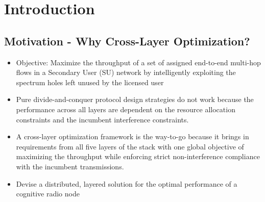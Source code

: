\documentclass[12pt, draftcls, onecolumn]{IEEEtran}
\begin{document}
\section{Introduction}
\subsection{Motivation - Why Cross-Layer Optimization?}
\begin{itemize}
  \item Objective: Maximize the throughput of a set of assigned end-to-end multi-hop flows in a Secondary User (SU) network by intelligently exploiting the spectrum holes left unused by the licensed user
  \item Pure divide-and-conquer protocol design strategies do not work because the performance across all layers are dependent on the resource allocation constraints and the incumbent interference constraints.
  \item A cross-layer optimization framework is the way-to-go because it brings in requirements from all five layers of the stack with one global objective of maximizing the throughput while enforcing strict non-interference compliance with the incumbent transmissions.
  \item Devise a distributed, layered solution for the optimal performance of a cognitive radio node
\end{itemize}
\end{document}
